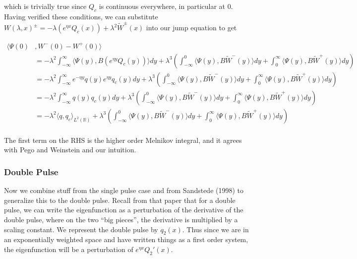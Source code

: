 \documentclass[12pt]{article}
\def\R{{\mathbb R}}
\begin{document}
which is trivially true since $Q_c$ is continuous everywhere, in particular at 0.\\

Having verified these conditions, we can substitute $W(\lambda, x)^\pm = -\lambda (e^{\eta x} Q_c(x)) + \lambda^2 \tilde{W}^\pm(x)$ into our jump equation to get

\begin{align*}
\langle\Psi(0) &, W^-(0) - W^+(0)\rangle \\
&= -\lambda^2 \int_{-\infty}^\infty \langle \Psi(y), B (e^{\eta y} Q_c(y)) \rangle dy + \lambda^3 \left( \int_{-\infty}^0 \langle \Psi(y), B \tilde{W}^-(y) \rangle dy + \int_0^\infty \langle \Psi(y), B \tilde{W}^+(y) \rangle dy \right) \\
&= -\lambda^2 \int_{-\infty}^\infty e^{-\eta y}q(y) e^{\eta y} q_c(y) dy + \lambda^3 \left( \int_{-\infty}^0 \langle \Psi(y), B \tilde{W}^-(y) \rangle dy + \int_0^\infty \langle \Psi(y), B \tilde{W}^+(y) \rangle dy \right) \\
&= -\lambda^2 \int_{-\infty}^\infty q(y) q_c(y) dy + \lambda^3 \left( \int_{-\infty}^0 \langle \Psi(y), B \tilde{W}^-(y) \rangle dy + \int_0^\infty \langle \Psi(y), B \tilde{W}^+(y) \rangle dy \right) \\
&= -\lambda^2 \langle q, q_c \rangle_{L^2(\R)} + \lambda^3 \left( \int_{-\infty}^0 \langle \Psi(y), B \tilde{W}^-(y) \rangle dy + \int_0^\infty \langle \Psi(y), B \tilde{W}^+(y) \rangle dy \right) \\
\end{align*}

The first term on the RHS is the higher order Melnikov integral, and it agrees with Pego and Weinstein and our intuition.

\subsubsection*{Double Pulse}

Now we combine stuff from the single pulse case and from Sandstede (1998) to generalize this to the double pulse. Recall from that paper that for a double pulse, we can write the eigenfunction as a perturbation of the derivative of the double pulse, where on the two ``big pieces'', the derivative is multiplied by a scaling constant. We represent the double pulse by $q_2(x)$. Thus since we are in an exponentially weighted space and have written things as a first order system, the eigenfunction will be a perturbation of $e^{\eta x}Q_2'(x)$.
\end{document}
